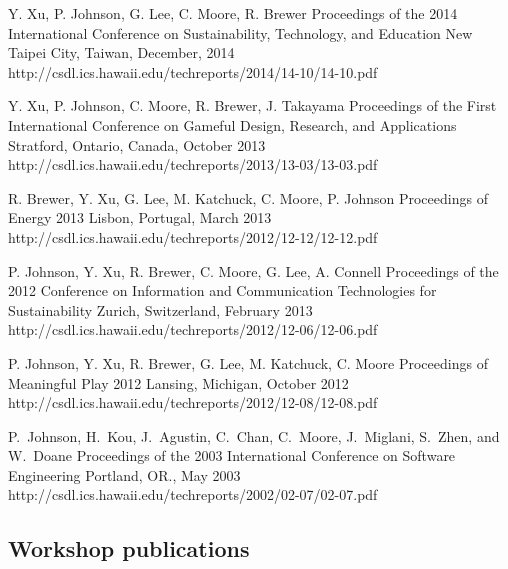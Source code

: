 \documentclass[11pt,letterpaper,sans]{moderncv} %
\begin{document}
          {Y. Xu, P. Johnson, G. Lee, C. Moore, R. Brewer}
          {Proceedings of the 2014 International Conference on Sustainability, Technology, and Education}
          {New Taipei City, Taiwan, December, 2014}
          {http://csdl.ics.hawaii.edu/techreports/2014/14-10/14-10.pdf}

          {Y. Xu, P. Johnson, C. Moore, R. Brewer, J. Takayama}
          {Proceedings of the First International Conference on Gameful Design, Research, and Applications}
          {Stratford, Ontario, Canada, October 2013}
          {http://csdl.ics.hawaii.edu/techreports/2013/13-03/13-03.pdf}

          {R. Brewer, Y. Xu, G. Lee, M. Katchuck, C. Moore, P. Johnson}
          {Proceedings of Energy 2013}
          {Lisbon, Portugal, March 2013}
          {http://csdl.ics.hawaii.edu/techreports/2012/12-12/12-12.pdf}

          {P. Johnson, Y. Xu, R. Brewer,  C. Moore,  G. Lee, A. Connell}
          {Proceedings of the 2012 Conference on Information and Communication Technologies for Sustainability}
          {Zurich, Switzerland, February 2013}
          {http://csdl.ics.hawaii.edu/techreports/2012/12-06/12-06.pdf}

          {P. Johnson, Y. Xu, R. Brewer, G. Lee, M. Katchuck, C. Moore}
          {Proceedings of Meaningful Play 2012}
          {Lansing, Michigan, October 2012}
          {http://csdl.ics.hawaii.edu/techreports/2012/12-08/12-08.pdf}

          {P.~Johnson, H.~Kou, J.~Agustin, C.~Chan, C.~Moore, J.~Miglani, S.~Zhen, and W.~Doane}
          {Proceedings of the 2003 International Conference on Software Engineering}
          {Portland, OR., May 2003}
          {http://csdl.ics.hawaii.edu/techreports/2002/02-07/02-07.pdf}

\subsection{Workshop publications}
\end{document}
